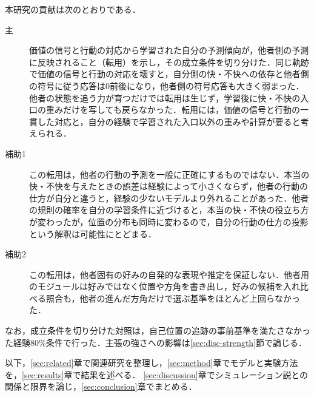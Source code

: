 本研究の貢献は次のとおりである．
\begin{description}
  \item[主] 価値の信号と行動の対応から学習された自分の予測傾向が，他者側の予測に反映されること（転用）を示し，その成立条件を切り分けた．同じ軌跡で価値の信号と行動の対応を壊すと，自分側の快・不快への依存と他者側の符号に従う応答は0前後になり，他者側の符号応答も大きく弱まった．他者の状態を追う力が育つだけでは転用は生じず，学習後に快・不快の入口の重みだけを写しても戻らなかった．転用には，価値の信号と行動の一貫した対応と，自分の経験で学習された入口以外の重みや計算が要ると考えられる．
  \item[補助1] この転用は，他者の行動の予測を一般に正確にするものではない．本当の快・不快を与えたときの誤差は経験によって小さくならず，他者の行動の仕方が自分と違うと，経験の少ないモデルより外れることがあった．他者の規則の確率を自分の学習条件に近づけると，本当の快・不快の役立ち方が変わったが，位置の分布も同時に変わるので，自分の行動の仕方の投影という解釈は可能性にとどまる．
  \item[補助2] この転用は，他者固有の好みの自発的な表現や推定を保証しない．他者用のモジュールは好みではなく位置や方角を書き出し，好みの候補を入れ比べる照合も，他者の進んだ方角だけで選ぶ基準をほとんど上回らなかった．
\end{description}

なお，成立条件を切り分けた対照は，自己位置の追跡の事前基準を満たさなかった経験80\%条件で行った．主張の強さへの影響は\ref{sec:disc-strength}節で論じる．

以下，\ref{sec:related}章で関連研究を整理し，\ref{sec:method}章でモデルと実験方法を，\ref{sec:results}章で結果を述べる．
\ref{sec:discussion}章でシミュレーション説との関係と限界を論じ，\ref{sec:conclusion}章でまとめる．
